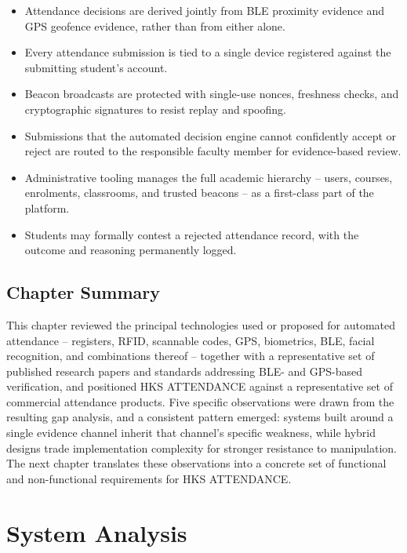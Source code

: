 \documentclass[12pt, a4paper, oneside]{report}
\begin{document}
\begin{itemize}
    \item Attendance decisions are derived jointly from BLE proximity evidence and GPS geofence evidence, rather than from either alone.
    \item Every attendance submission is tied to a single device registered against the submitting student's account.
    \item Beacon broadcasts are protected with single-use nonces, freshness checks, and cryptographic signatures to resist replay and spoofing.
    \item Submissions that the automated decision engine cannot confidently accept or reject are routed to the responsible faculty member for evidence-based review.
    \item Administrative tooling manages the full academic hierarchy -- users, courses, enrolments, classrooms, and trusted beacons -- as a first-class part of the platform.
    \item Students may formally contest a rejected attendance record, with the outcome and reasoning permanently logged.
\end{itemize}

\section{Chapter Summary}

This chapter reviewed the principal technologies used or proposed for automated attendance -- registers, RFID, scannable codes, GPS, biometrics, BLE, facial recognition, and combinations thereof -- together with a representative set of published research papers and standards addressing BLE- and GPS-based verification, and positioned HKS ATTENDANCE against a representative set of commercial attendance products. Five specific observations were drawn from the resulting gap analysis, and a consistent pattern emerged: systems built around a single evidence channel inherit that channel's specific weakness, while hybrid designs trade implementation complexity for stronger resistance to manipulation. The next chapter translates these observations into a concrete set of functional and non-functional requirements for HKS ATTENDANCE.

\chapter{System Analysis}
\label{chap:analysis}
\end{document}
